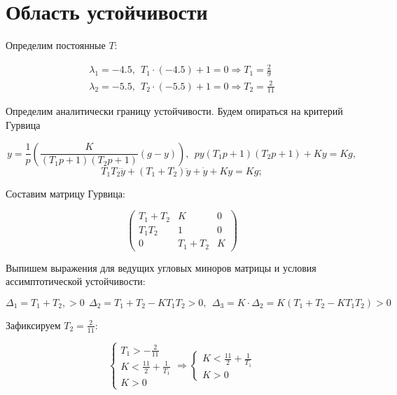 \section{Область устойчивости}

Определим постоянные $T$:


\begin{par}
$$\begin{array}{l}
\lambda_1 =-4.5,~~T_1 \cdot (-4.5)+1=0\Rightarrow T_1 =\frac{2}{9}\\
\lambda_2 =-5.5,~~T_2 \cdot (-5.5)+1=0\Rightarrow T_2 =\frac{2}{11}
\end{array}$$
\end{par}

Определим аналитически границу устойчивости. Будем опираться на критерий Гурвица

$$
y=\frac{1}{p}\left(\frac{K}{(T_1 p+1)(T_2 p+1)}(g-y)\right),~~py(T_1 p+1)(T_2 p+1)+Ky=Kg,
$$
$$
T_1 T_2 \dddot{y} +(T_1 +T_2 )\ddot{y} +\dot{y} +Ky=Kg;
$$

Составим матрицу Гурвица:

\begin{par}
$$\left(\begin{array}{ccc}
T_1 +T_2  & K & 0\\
T_1 T_2  & 1 & 0\\
0 & T_1 +T_2  & K
\end{array}\right)$$
\end{par}

Выпишем выражения для ведущих угловых миноров матрицы и условия ассимптотической устойчивости:

\begin{par}
$$\Delta_1 =T_1 +T_2 ,>0~~\Delta_2 =T_1 +T_2 -KT_1 T_2 >0,~~\Delta_3 =K\cdot \Delta_2 =K(T_1 +T_2 -KT_1 T_2 )>0$$    
\end{par}

Зафиксируем $T_2 =\frac{2}{11}$:

\begin{par}
$$\left\lbrace \begin{array}{c}
T_1 >-\frac{2}{11}\\
K<\frac{11}{2}+\frac{1}{T_1 }\\
K>0
\end{array}\right.\Rightarrow \left\lbrace \begin{array}{c}
K<\frac{11}{2}+\frac{1}{T_1 }\\
K>0
\end{array}\right.$$
\end{par}

